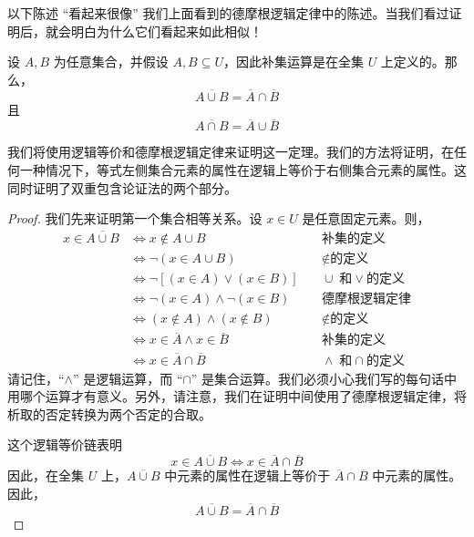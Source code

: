 以下陈述 ``看起来很像'' 我们上面看到的德摩根逻辑定律中的陈述。当我们看过证明后，就会明白为什么它们看起来如此相似！

\begin{theorem}
    设 $A, B$ 为任意集合，并假设 $A, B \subseteq U$，因此补集运算是在全集 $U$ 上定义的。那么，
    \[\overline{A \cup B} = \overline{A} \cap \overline{B}\]
    且
    \[\overline{A \cap B} = \overline{A} \cup \overline{B}\]
\end{theorem}

我们将使用逻辑等价和德摩根逻辑定律来证明这一定理。我们的方法将证明，在任何一种情况下，等式左侧集合元素的属性在逻辑上等价于右侧集合元素的属性。这同时证明了双重包含论证法的两个部分。

\begin{proof}
    我们先来证明第一个集合相等关系。设 $x \in U$ 是任意固定元素。则，
    \begin{align*}
        x \in \overline{A \cup B} &\iff x \notin A \cup B &\quad \text{补集的定义}\\
        &\iff \neg(x \in A \cup B) &\quad \notin \text{的定义}\\
        &\iff \neg[(x \in A) \lor (x \in B)] &\quad \cup \;\text{和} \lor \text{的定义}\\
        &\iff \neg(x \in A) \land \neg(x \in B) &\quad \text{德摩根逻辑定律}\\
        &\iff (x \notin A) \land (x \notin B) &\quad \notin \text{的定义}\\
        &\iff x \in \overline{A} \land x \in \overline{B} &\quad \text{补集的定义}\\
        &\iff x \in \overline{A} \cap \overline{B} &\quad \land \;\text{和} \cap \text{的定义}
    \end{align*}
    请记住，``$\land$'' 是逻辑运算，而 ``$\cap$'' 是集合运算。我们必须小心我们写的每句话中用哪个运算才有意义。另外，请注意，我们在证明中间使用了德摩根逻辑定律，将析取的否定转换为两个否定的合取。

    这个逻辑等价链表明
    \[x \in \overline{A \cup B} \iff x \in \overline{A} \cap \overline{B}\]
    因此，在全集 $U$ 上，$\overline{A \cup B}$ 中元素的属性在逻辑上等价于 $\overline{A} \cap \overline{B}$ 中元素的属性。因此，
    \[\overline{A \cup B} = \overline{A} \cap \overline{B}\]


\end{proof}
